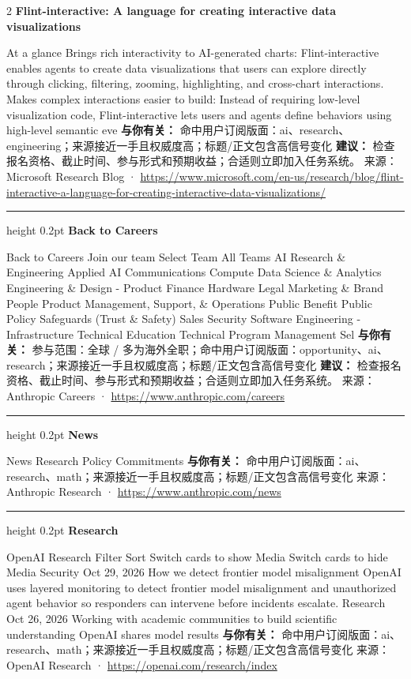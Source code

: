 \documentclass[10.5pt]{ctexart}
\begin{document}
\begin{multicols}{2}
{\large\bfseries Flint-interactive: A language for creating interactive data visualizations}\par
At a glance Brings rich interactivity to AI-generated charts: Flint-interactive enables agents to create data visualizations that users can explore directly through clicking, filtering, zooming, highlighting, and cross-chart interactions. Makes complex interactions easier to build: Instead of requiring low-level visualization code, Flint-interactive lets users and agents define behaviors using high-level semantic eve
\textbf{与你有关：} 命中用户订阅版面：ai、research、engineering；来源接近一手且权威度高；标题/正文包含高信号变化
\textbf{建议：} 检查报名资格、截止时间、参与形式和预期收益；合适则立即加入任务系统。
{\footnotesize\color{ormuted} 来源：Microsoft Research Blog · \url{https://www.microsoft.com/en-us/research/blog/flint-interactive-a-language-for-creating-interactive-data-visualizations/}}
\vspace{2mm}
\hrule height 0.2pt
\vspace{2mm}
{\large\bfseries Back to Careers}\par
Back to Careers Join our team Select Team All Teams AI Research \& Engineering Applied AI Communications Compute Data Science \& Analytics Engineering \& Design - Product Finance Hardware Legal Marketing \& Brand People Product Management, Support, \& Operations Public Benefit Public Policy Safeguards (Trust \& Safety) Sales Security Software Engineering - Infrastructure Technical Education Technical Program Management Sel
\textbf{与你有关：} 参与范围：全球 / 多为海外全职；命中用户订阅版面：opportunity、ai、research；来源接近一手且权威度高；标题/正文包含高信号变化
\textbf{建议：} 检查报名资格、截止时间、参与形式和预期收益；合适则立即加入任务系统。
{\footnotesize\color{ormuted} 来源：Anthropic Careers · \url{https://www.anthropic.com/careers}}
\vspace{2mm}
\hrule height 0.2pt
\vspace{2mm}
{\large\bfseries News}\par
News Research Policy Commitments
\textbf{与你有关：} 命中用户订阅版面：ai、research、math；来源接近一手且权威度高；标题/正文包含高信号变化
{\footnotesize\color{ormuted} 来源：Anthropic Research · \url{https://www.anthropic.com/news}}
\vspace{2mm}
\hrule height 0.2pt
\vspace{2mm}
{\large\bfseries Research}\par
OpenAI Research Filter Sort Switch cards to show Media Switch cards to hide Media Security Oct 29, 2026 How we detect frontier model misalignment OpenAI uses layered monitoring to detect frontier model misalignment and unauthorized agent behavior so responders can intervene before incidents escalate. Research Oct 26, 2026 Working with academic communities to build scientific understanding OpenAI shares model results 
\textbf{与你有关：} 命中用户订阅版面：ai、research、math；来源接近一手且权威度高；标题/正文包含高信号变化
{\footnotesize\color{ormuted} 来源：OpenAI Research · \url{https://openai.com/research/index}}
\end{multicols}
\end{document}
